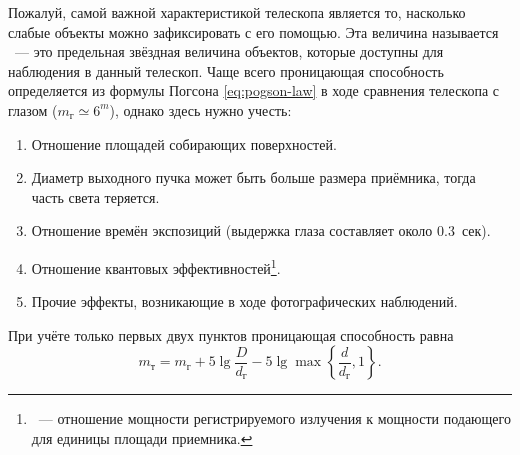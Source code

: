 Пожалуй, самой важной характеристикой телескопа является то, насколько слабые объекты можно зафиксировать с его помощью. Эта величина называется ~--- это предельная звёздная величина объектов, которые доступны для наблюдения в данный телескоп. Чаще всего проницающая способность определяется из формулы Погсона \eqref{eq:pogson-law} в ходе сравнения телескопа с глазом ($m_\text{г} \simeq 6^m$), однако здесь нужно учесть:
\begin{enumerate}
	\item Отношение площадей собирающих поверхностей.
	\item Диаметр выходного пучка может быть больше размера приёмника, тогда часть света теряется.
	\item Отношение времён экспозиций (выдержка глаза составляет около 0.3~сек).
	\item Отношение квантовых эффективностей\footnote{~--- отношение мощности регистрируемого излучения к мощности подающего для единицы площади приемника.}.
	\item Прочие эффекты, возникающие в ходе фотографических наблюдений.
\end{enumerate}
При учёте только первых двух пунктов проницающая способность равна
\begin{equation}
	m_\text{т} = m_\text{г} + 5\lg\frac{D}{d_\text{г}} - 5\lg\max \left\{ \frac{d}{d_\text{г}}, 1\right\}.
\end{equation}

